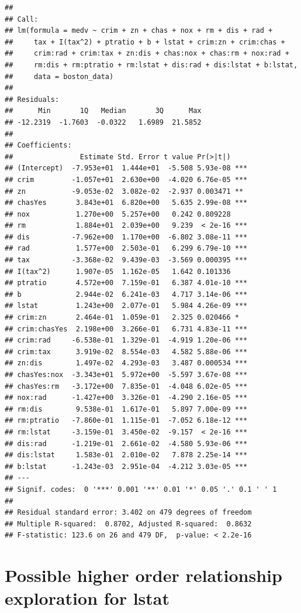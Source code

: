\documentclass[
]{article}
\begin{document}
\begin{verbatim}
## 
## Call:
## lm(formula = medv ~ crim + zn + chas + nox + rm + dis + rad + 
##     tax + I(tax^2) + ptratio + b + lstat + crim:zn + crim:chas + 
##     crim:rad + crim:tax + zn:dis + chas:nox + chas:rm + nox:rad + 
##     rm:dis + rm:ptratio + rm:lstat + dis:rad + dis:lstat + b:lstat, 
##     data = boston_data)
## 
## Residuals:
##      Min       1Q   Median       3Q      Max 
## -12.2319  -1.7603  -0.0322   1.6989  21.5852 
## 
## Coefficients:
##                Estimate Std. Error t value Pr(>|t|)    
## (Intercept)  -7.953e+01  1.444e+01  -5.508 5.93e-08 ***
## crim         -1.057e+01  2.630e+00  -4.020 6.76e-05 ***
## zn           -9.053e-02  3.082e-02  -2.937 0.003471 ** 
## chasYes       3.843e+01  6.820e+00   5.635 2.99e-08 ***
## nox           1.270e+00  5.257e+00   0.242 0.809228    
## rm            1.884e+01  2.039e+00   9.239  < 2e-16 ***
## dis          -7.962e+00  1.170e+00  -6.802 3.08e-11 ***
## rad           1.577e+00  2.503e-01   6.299 6.79e-10 ***
## tax          -3.368e-02  9.439e-03  -3.569 0.000395 ***
## I(tax^2)      1.907e-05  1.162e-05   1.642 0.101336    
## ptratio       4.572e+00  7.159e-01   6.387 4.01e-10 ***
## b             2.944e-02  6.241e-03   4.717 3.14e-06 ***
## lstat         1.243e+00  2.077e-01   5.984 4.26e-09 ***
## crim:zn       2.464e-01  1.059e-01   2.325 0.020466 *  
## crim:chasYes  2.198e+00  3.266e-01   6.731 4.83e-11 ***
## crim:rad     -6.538e-01  1.329e-01  -4.919 1.20e-06 ***
## crim:tax      3.919e-02  8.554e-03   4.582 5.88e-06 ***
## zn:dis        1.497e-02  4.293e-03   3.487 0.000534 ***
## chasYes:nox  -3.343e+01  5.972e+00  -5.597 3.67e-08 ***
## chasYes:rm   -3.172e+00  7.835e-01  -4.048 6.02e-05 ***
## nox:rad      -1.427e+00  3.326e-01  -4.290 2.16e-05 ***
## rm:dis        9.538e-01  1.617e-01   5.897 7.00e-09 ***
## rm:ptratio   -7.860e-01  1.115e-01  -7.052 6.18e-12 ***
## rm:lstat     -3.159e-01  3.450e-02  -9.157  < 2e-16 ***
## dis:rad      -1.219e-01  2.661e-02  -4.580 5.93e-06 ***
## dis:lstat     1.583e-01  2.010e-02   7.878 2.25e-14 ***
## b:lstat      -1.243e-03  2.951e-04  -4.212 3.03e-05 ***
## ---
## Signif. codes:  0 '***' 0.001 '**' 0.01 '*' 0.05 '.' 0.1 ' ' 1
## 
## Residual standard error: 3.402 on 479 degrees of freedom
## Multiple R-squared:  0.8702, Adjusted R-squared:  0.8632 
## F-statistic: 123.6 on 26 and 479 DF,  p-value: < 2.2e-16
\end{verbatim}

\section{Possible higher order relationship exploration for
lstat}\label{possible-higher-order-relationship-exploration-for-lstat}
\end{document}
